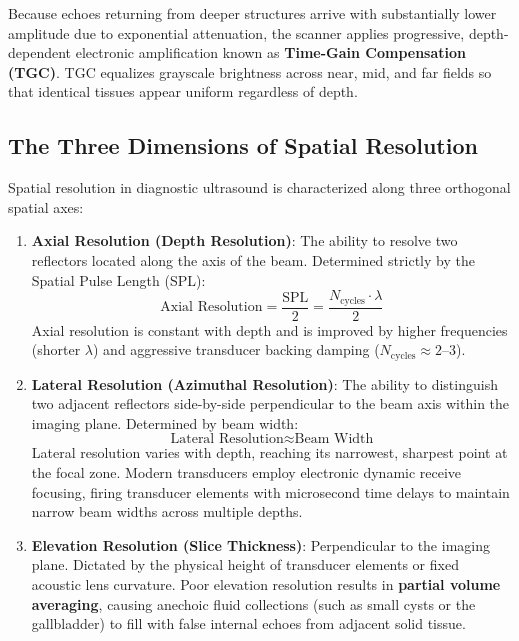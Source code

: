 \documentclass[11pt,a4paper]{article}
\begin{document}
Because echoes returning from deeper structures arrive with substantially lower amplitude due to exponential attenuation, the scanner applies progressive, depth-dependent electronic amplification known as \textbf{Time-Gain Compensation (TGC)}. TGC equalizes grayscale brightness across near, mid, and far fields so that identical tissues appear uniform regardless of depth.

\subsection{The Three Dimensions of Spatial Resolution}
Spatial resolution in diagnostic ultrasound is characterized along three orthogonal spatial axes:
\begin{enumerate}[leftmargin=*]
    \item \textbf{Axial Resolution (Depth Resolution)}: The ability to resolve two reflectors located along the axis of the beam. Determined strictly by the Spatial Pulse Length (SPL):
    \begin{equation}
        \text{Axial Resolution} = \frac{\text{SPL}}{2} = \frac{N_{\text{cycles}} \cdot \lambda}{2}
    \end{equation}
    Axial resolution is constant with depth and is improved by higher frequencies (shorter $\lambda$) and aggressive transducer backing damping ($N_{\text{cycles}} \approx 2\text{--}3$).
    \item \textbf{Lateral Resolution (Azimuthal Resolution)}: The ability to distinguish two adjacent reflectors side-by-side perpendicular to the beam axis within the imaging plane. Determined by beam width:
    \begin{equation}
        \text{Lateral Resolution} \approx \text{Beam Width}
    \end{equation}
    Lateral resolution varies with depth, reaching its narrowest, sharpest point at the focal zone. Modern transducers employ electronic dynamic receive focusing, firing transducer elements with microsecond time delays to maintain narrow beam widths across multiple depths.
    \item \textbf{Elevation Resolution (Slice Thickness)}: Perpendicular to the imaging plane. Dictated by the physical height of transducer elements or fixed acoustic lens curvature. Poor elevation resolution results in \textbf{partial volume averaging}, causing anechoic fluid collections (such as small cysts or the gallbladder) to fill with false internal echoes from adjacent solid tissue.
\end{enumerate}
\end{document}
